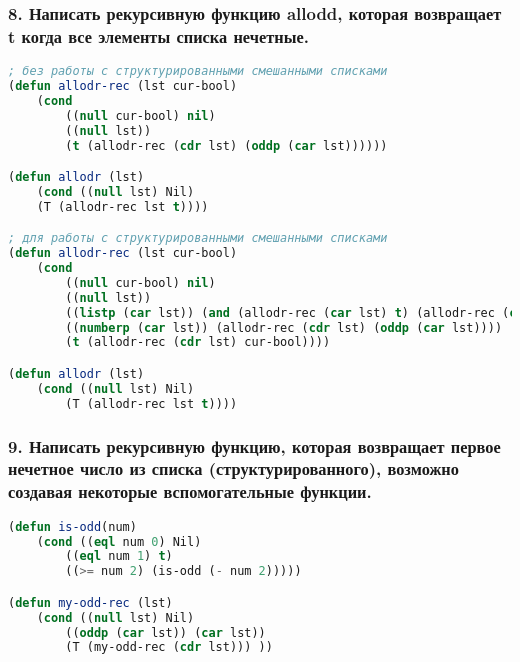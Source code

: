 \subsubsection*{8. Написать рекурсивную функцию allodd, которая возвращает t когда все элементы списка	нечетные.}
\begin{lstlisting}[language=Lisp]
; без работы с структурированными смешанными списками
(defun allodr-rec (lst cur-bool)
	(cond
		((null cur-bool) nil)
		((null lst))
		(t (allodr-rec (cdr lst) (oddp (car lst))))))

(defun allodr (lst)
	(cond ((null lst) Nil)
	(T (allodr-rec lst t))))

; для работы с структурированными смешанными списками
(defun allodr-rec (lst cur-bool)
	(cond
		((null cur-bool) nil)
		((null lst))
		((listp (car lst)) (and (allodr-rec (car lst) t) (allodr-rec (cdr lst) cur-bool)))
		((numberp (car lst)) (allodr-rec (cdr lst) (oddp (car lst))))
		(t (allodr-rec (cdr lst) cur-bool))))

(defun allodr (lst)
	(cond ((null lst) Nil)
		(T (allodr-rec lst t))))
\end{lstlisting}

\newpage
\subsubsection*{9. Написать рекурсивную функцию, которая возвращает первое нечетное число из списка (структурированного), возможно создавая некоторые вспомогательные функции.}
\begin{lstlisting}[language=Lisp]
(defun is-odd(num)
	(cond ((eql num 0) Nil)
		((eql num 1) t)
		((>= num 2) (is-odd (- num 2)))))

(defun my-odd-rec (lst)
	(cond ((null lst) Nil)
		((oddp (car lst)) (car lst))
		(T (my-odd-rec (cdr lst))) ))
\end{lstlisting}

\newpage
